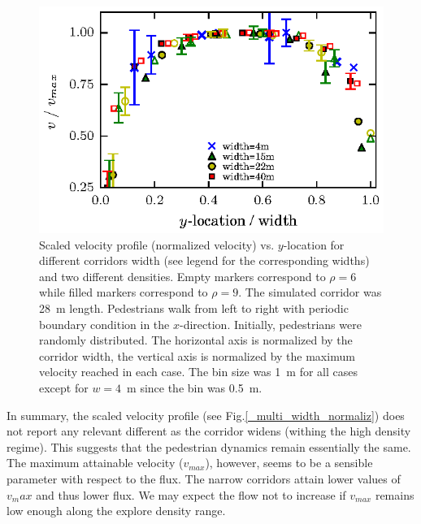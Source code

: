 \begin{figure}[htbp!]
\includegraphics[width=\columnwidth]
{plots/v(y)_multi_width_normaliz.eps}
\caption{\label{speed-profile-width-normaliz} Scaled velocity profile (normalized velocity) vs. $y$-location for different corridors width (see legend for the corresponding widths) and two different densities. Empty markers correspond to $\rho=6$ while filled markers correspond to  $\rho=9$. The simulated corridor was 28~m length. Pedestrians walk from left to right with periodic boundary condition in the $x$-direction. Initially, pedestrians were randomly distributed. The horizontal axis is normalized by the corridor width, the vertical axis is normalized by the maximum velocity reached in each case.  The bin size was 1~m for all cases except for $w=4$~m since the bin was 0.5~m.}
\end{figure}

In summary, the scaled velocity profile (see Fig.\ref{_multi_width_normaliz}) does not report any relevant different as the corridor widens (withing the high density regime). This suggests that the pedestrian dynamics remain essentially the same. The maximum attainable velocity ($v_{max}$), however, seems to be a sensible parameter with respect to the flux.  The narrow corridors attain lower values of $v_max$ and thus lower flux. We may expect the flow not to increase if $v_{max}$ remains low enough along the explore density range.\\


